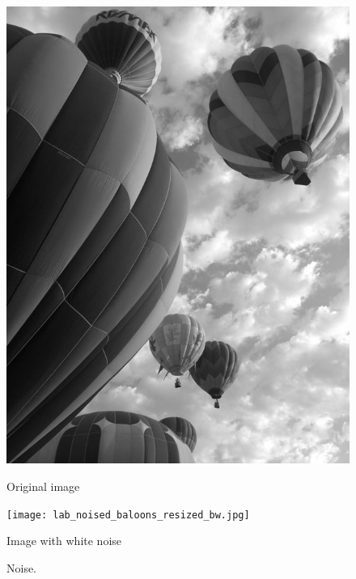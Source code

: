 %
%
%
\begin{figure}
\begin{minipage}[b]{.47\linewidth}
\centering
\includegraphics[width=\textwidth]{balloons_resized_bw.jpg}
\caption*{Original image}
\end{minipage}
\hspace{0.5cm}
\begin{minipage}[b]{0.47\linewidth}
\centering
\texttt{[image: lab\_noised\_baloons\_resized\_bw.jpg]}
\caption*{Image with white noise}
\end{minipage}
\caption{Noise.}
\label{fig:noise_firstattempt}
\end{figure}

